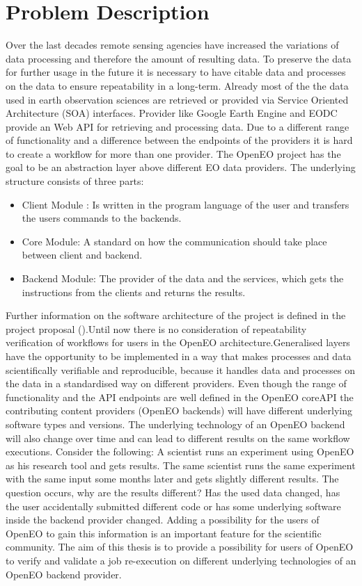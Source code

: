 \documentclass[draft,final]{vutinfth} %
\begin{document}
\section{Problem Description}
Over the last decades remote sensing agencies have increased the variations of data processing and therefore the amount of resulting data. To preserve the data for further usage in the future it is necessary to have citable data and processes on the data to ensure repeatability in a long-term.\cite{6352411} 
Already most of the the data used in earth observation sciences are retrieved or provided via Service Oriented Architecture (SOA) interfaces. Provider like Google Earth Engine and EODC provide an Web API for retrieving and processing data. Due to a different range of functionality and a difference between the endpoints of the providers it is hard to create a workflow for more than one provider.  
The OpenEO project has the goal to be an abstraction layer above different EO data providers. The underlying structure consists of three parts:
\begin{itemize}
	\item Client Module : Is written in the program language of the user and transfers the users commands to the backends.
	\item Core Module: A standard on how the communication should take place between client and backend.
	\item Backend Module: The provider of the data and the services, which gets the instructions from the clients and returns the results.
\end{itemize}   
Further information on the software architecture of the project is defined in the project proposal (\cite{openeo}).Until now there is no consideration of repeatability verification of workflows for users in the OpenEO architecture.Generalised layers have the opportunity to be implemented in a way that makes processes and data scientifically verifiable and reproducible, because it handles data and processes on the data in a standardised way on different providers. Even though the range of functionality and the API endpoints are well defined in the OpenEO coreAPI the contributing content providers (OpenEO backends) will have different underlying software types and versions. The underlying technology of an OpenEO backend will also change over time and can lead to different results on the same workflow executions. Consider the following: A scientist runs an experiment using OpenEO as his research tool and gets results. The same scientist runs the same experiment with the same input some months later and gets slightly different results. The question occurs, why are the results different? Has the used data changed, has the user accidentally submitted different code or has some underlying software inside the backend provider changed. Adding a possibility for the users of OpenEO to gain this information is an important feature for the scientific community. The aim of this thesis is to provide a possibility for users of OpenEO to verify and validate a job re-execution on different underlying technologies of an OpenEO backend provider.\cite{openeo}
\end{document}
